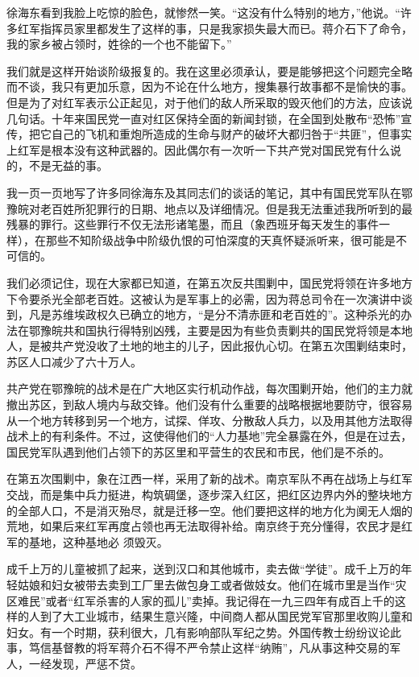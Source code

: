 \documentclass[10pt]{book}
\begin{document}
徐海东看到我脸上吃惊的脸色，就惨然一笑。“这没有什么特别的地方，”他说。“许多红军指挥员家里都发生了这样的事，只是我家损失最大而已。蒋介石下了命令，我的家乡被占领时，姓徐的一个也不能留下。”

我们就是这样开始谈阶级报复的。我在这里必须承认，要是能够把这个问题完全略而不谈，我只有更加乐意，因为不论在什么地方，搜集暴行故事都不是愉快的事。但是为了对红军表示公正起见，对于他们的敌人所采取的毁灭他们的方法，应该说几句话。十年来国民党一直对红区保持全面的新闻封锁，在全国到处散布“恐怖”宣传，把它自己的飞机和重炮所造成的生命与财产的破坏大都归咎于“共匪”，但事实上红军是根本没有这种武器的。因此偶尔有一次听一下共产党对国民党有什么说的，不是无益的事。

我一页一页地写了许多同徐海东及其同志们的谈话的笔记，其中有国民党军队在鄂豫皖对老百姓所犯罪行的日期、地点以及详细情况。但是我无法重述我所听到的最残暴的罪行。这些罪行不仅无法形诸笔墨，而且（象西班牙每天发生的事件一样），在那些不知阶级战争中阶级仇恨的可怕深度的天真怀疑派听来，很可能是不可信的。

我们必须记住，现在大家都已知道，在第五次反共围剿中，国民党将领在许多地方下令要杀光全部老百姓。这被认为是军事上的必需，因为蒋总司令在一次演讲中谈到，凡是苏维埃政权久已确立的地方，“是分不清赤匪和老百姓的”。这种杀光的办法在鄂豫皖共和国执行得特别凶残，主要是因为有些负责剿共的国民党将领是本地人，是被共产党没收了土地的地主的儿子，因此报仇心切。在第五次围剿结束时，苏区人口减少了六十万人。

共产党在鄂豫皖的战术是在广大地区实行机动作战，每次围剿开始，他们的主力就撤出苏区，到敌人境内与敌交锋。他们没有什么重要的战略根据地要防守，很容易从一个地方转移到另一个地方，试探、佯攻、分散敌人兵力，以及用其他方法取得战术上的有利条件。不过，这使得他们的“人力基地”完全暴露在外，但是在过去，国民党军队遇到他们占领下的苏区里和平营生的农民和市民，他们是不杀的。

在第五次围剿中，象在江西一样，采用了新的战术。南京军队不再在战场上与红军交战，而是集中兵力挺进，构筑碉堡，逐步深入红区，把红区边界内外的整块地方的全部人口，不是消灭殆尽，就是迁移一空。他们要把这样的地方化为阒无人烟的荒地，如果后来红军再度占领也再无法取得补给。南京终于充分懂得，农民才是红军的基地，这种基地必 须毁灭。

成千上万的儿童被抓了起来，送到汉口和其他城市，卖去做“学徒”。成千上万的年轻姑娘和妇女被带去卖到工厂里去做包身工或者做妓女。他们在城市里是当作“灾区难民”或者“红军杀害的人家的孤儿”卖掉。我记得在一九三四年有成百上千的这样的人到了大工业城市，结果生意兴隆，中间商人都从国民党军官那里收购儿童和妇女。有一个时期，获利很大，几有影响部队军纪之势。外国传教士纷纷议论此事，笃信基督教的将军蒋介石不得不严令禁止这样“纳贿”，凡从事这种交易的军人，一经发现，严惩不贷。
\end{document}
